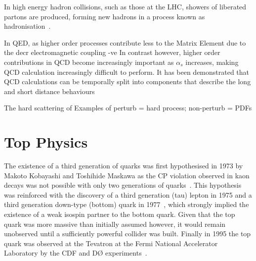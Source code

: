 In high energy hadron collisions, such as those at the LHC, showers of liberated partons are produced, forming new hadrons in a process known as hadronisation~\cite{Andersson:1983ia}.


In QED, as higher order processes contribute less to the Matrix Element due to the decr electromagnetic coupling  -ve
In contrast however, higher order contributions in QCD become increasingly important as $\alpha_{s}$ increases, making QCD calculation increasingly difficult to perform.
It has been demonstrated that QCD calculations can be temporally split into components that describe the long and short distance behaviours

The hard scattering of 
Examples of perturb = hard process; non-perturb = PDFs

%

%

\section{Top Physics}\label{sec:top-physics}
The existence of a third generation of quarks was first hypothesised in 1973 by Makoto Kobayashi and Toshihide Maskawa as the CP violation observed in kaon decays was not possible with only two generations of quarks~\cite{Kobayashi:1973fv}.
This hypothesis was reinforced with the discovery of a third generation (tau) lepton in 1975 and a third generation down-type (bottom) quark in 1977~\cite{Herb:1977ek}, which strongly implied the existence of a weak isospin partner to the bottom quark.
Given that the top quark was more massive than initially assumed however, it would remain unobserved until a sufficiently powerful collider was built.
Finally in 1995 the top quark was observed at the Tevatron at the Fermi National Accelerator Laboratory by the CDF and D\O\xspace experiments~\cite{Abe:1995hr,D0:1995jca}.

